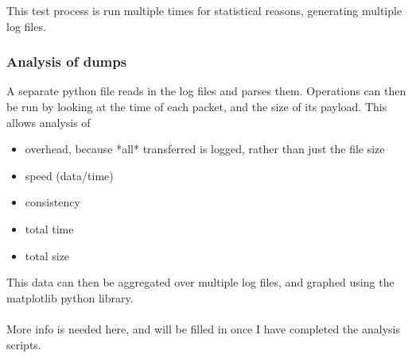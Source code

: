 \documentclass{sig-alternate-05-2015}
\begin{document}
This test process is run multiple times for statistical reasons, generating multiple log files.

\subsubsection{Analysis of dumps}
A separate python file reads in the log files and parses them. Operations can then be run by looking at the time of each packet, and the size of its payload. This allows analysis of
\begin{itemize}
	\item overhead, because *all* transferred is logged, rather than just the file size
	\item speed (data/time)
	\item consistency
	\item total time
	\item total size
\end{itemize}

This data can then be aggregated over multiple log files, and graphed using the matplotlib python library.\\\\
More info is needed here, and will be filled in once I have completed the analysis scripts.


 
\end{document}
